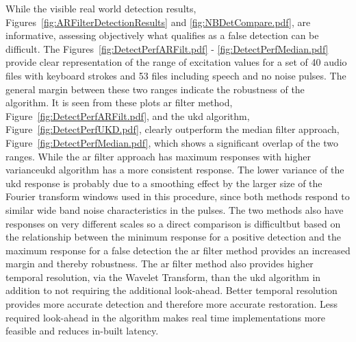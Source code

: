 While the visible real world detection results, Figures~\ref{fig:ARFilterDetectionResults} and \ref{fig:NBDetCompare.pdf}, are informative, assessing objectively what qualifies as a false detection can be difficult. The Figures~\ref{fig:DetectPerfARFilt.pdf} - \ref{fig:DetectPerfMedian.pdf} provide clear representation of the range of excitation values for a set of 40 audio files with keyboard strokes and 53 files including speech and no noise pulses. The general margin between these two ranges indicate the robustness of the algorithm. It is seen from these plots \DIFdelbegin {}\DIFdelend \DIFaddbegin {}\gls{ar} \DIFaddend filter method, Figure~\ref{fig:DetectPerfARFilt.pdf}, and the \DIFdelbegin {}\DIFdelend \DIFaddbegin \gls{ukd} \DIFaddend algorithm, Figure~\ref{fig:DetectPerfUKD.pdf}, clearly outperform the median filter approach, Figure~\ref{fig:DetectPerfMedian.pdf}, which shows a significant overlap of the two ranges. While the \DIFdelbegin {}\DIFdelend \DIFaddbegin \gls{ar} \DIFaddend filter approach has maximum responses with higher variance\DIFdelbegin {}\DIFdelend \DIFaddbegin {}\gls{ukd} \DIFaddend algorithm has a more consistent response. The lower variance of the \DIFdelbegin {}\DIFdelend \DIFaddbegin \gls{ukd} \DIFaddend response is probably due to a smoothing effect by the larger size of the Fourier transform windows used in this procedure, since both methods respond to similar wide band noise characteristics in the pulses. The two methods also have responses on very different scales so a direct comparison is difficult\DIFaddbegin \DIFadd{, }\DIFaddend but based on the relationship between the minimum response for a positive detection and the maximum response for a false detection the \DIFdelbegin {}\DIFdelend \DIFaddbegin \gls{ar} \DIFaddend filter method provides an increased margin and thereby robustness. The \DIFdelbegin {}\DIFdelend \DIFaddbegin \gls{ar} \DIFaddend filter method also provides higher temporal resolution, via the Wavelet Transform, than the \DIFdelbegin {}\DIFdelend \DIFaddbegin \gls{ukd} \DIFaddend algorithm in addition to not requiring the additional look-ahead. Better temporal resolution provides more accurate detection and therefore more accurate restoration. Less required look-ahead in the algorithm makes real time implementations more feasible and reduces in-built latency.

